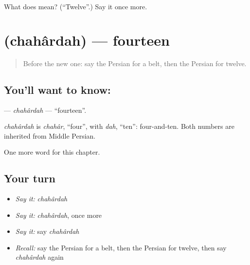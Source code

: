 \begin{tcolorbox}[breakable,colback=teal!4,colframe=teal!35!black,title={Before you move on}]
What does  mean? (\textquotedblleft{}Twelve\textquotedblright{}.) Say it once more.
\end{tcolorbox}
\section[\texorpdfstring{\fa{چهارده} (chahârdah)}{چهارده (chahârdah)}]{ (chahârdah) — fourteen}

\label{lesson:FA-C75-chahardah}



\begin{quote}
Before the new one: say the Persian for a belt, then the Persian for twelve.
\end{quote}

\subsection*{You'll want to know: }
\textbf{} — \emph{chahârdah} — \textquotedblleft{}fourteen\textquotedblright{}.

\begin{cousinweb}
\emph{chahârdah} is \emph{chahâr}, \textquotedblleft{}four\textquotedblright{}, with \emph{dah}, \textquotedblleft{}ten\textquotedblright{}: four-and-ten. Both numbers are inherited from Middle Persian.
\end{cousinweb}

\begin{grammarlens}[title={What you've built}]
One more word for this chapter.
\end{grammarlens}

\subsection*{Your turn}
\begin{itemize}
\raggedright
  \item \emph{Say it:} \emph{chahârdah}
  \item \emph{Say it:} \emph{chahârdah}, once more
  \item \emph{Say it:} say \emph{chahârdah}
  \item \emph{Recall:} say the Persian for a belt, then the Persian for twelve, then say \emph{chahârdah} again
\end{itemize}

